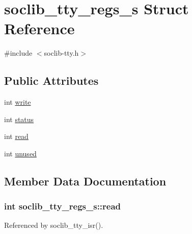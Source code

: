 \hypertarget{structsoclib__tty__regs__s}{\section{soclib\-\_\-tty\-\_\-regs\-\_\-s Struct Reference}
\label{structsoclib__tty__regs__s}
}


{\ttfamily \#include $<$soclib-\/tty.\-h$>$}

\subsection*{Public Attributes}
\begin{DoxyCompactItemize}
\item 
int \hyperlink{structsoclib__tty__regs__s_ad0f5bc1340be3f28fb65d8174d95c846}{write}
\item 
int \hyperlink{structsoclib__tty__regs__s_a6aa0e45df47d0a468508e334b77abc63}{status}
\item 
int \hyperlink{structsoclib__tty__regs__s_a1cfb8ccac69fc204c1d0c9e946e5a94f}{read}
\item 
int \hyperlink{structsoclib__tty__regs__s_a10fe1a4e54b9ada17beed24b9c659be1}{unused}
\end{DoxyCompactItemize}


\subsection{Member Data Documentation}
\hypertarget{structsoclib__tty__regs__s_a1cfb8ccac69fc204c1d0c9e946e5a94f}{
\subsubsection[{read}]{\setlength{\rightskip}{0pt plus 5cm}int soclib\-\_\-tty\-\_\-regs\-\_\-s\-::read}}\label{structsoclib__tty__regs__s_a1cfb8ccac69fc204c1d0c9e946e5a94f}


Referenced by soclib\-\_\-tty\-\_\-isr().

